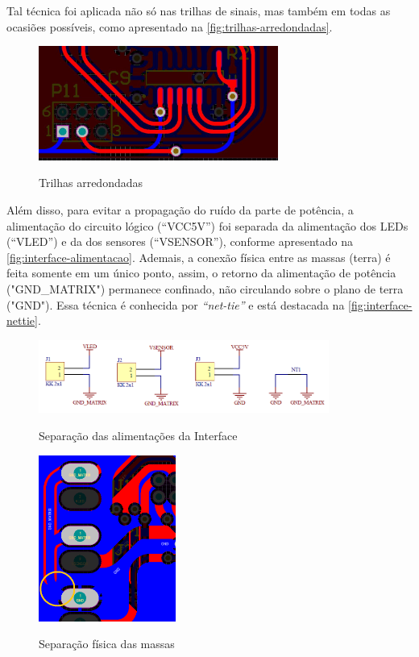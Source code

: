 Tal técnica foi aplicada não só nas trilhas de sinais, mas também em todas as ocasiões possíveis, como apresentado na \autoref{fig:trilhas-arredondadas}.

\begin{figure}[H]
    \centering
    \caption{Trilhas arredondadas}
    \includegraphics[width=0.7\textwidth]{./dados/figuras/trilhas-arredondadas}
    \label{fig:trilhas-arredondadas}
\end{figure}

Além disso, para evitar a propagação do ruído da parte de potência, a alimentação do circuito lógico (``VCC5V'') foi separada da alimentação dos LEDs (``VLED'') e da dos sensores (``VSENSOR''), conforme apresentado na \autoref{fig:interface-alimentacao}. Ademais, a conexão física entre as massas (terra) é feita somente em um único ponto, assim, o retorno da alimentação de potência ("GND\_MATRIX") permanece confinado, não circulando sobre o plano de terra ("GND"). Essa técnica é conhecida por \emph{``net-tie''} e está destacada na \autoref{fig:interface-nettie}.

\begin{figure}[H]
    \centering
    \caption{Separação das alimentações da Interface}
    \includegraphics[width=0.85\textwidth]{./dados/figuras/alimentacao-interface}
    \label{fig:interface-alimentacao}
\end{figure}

\begin{figure}[H]
    \centering
    \caption{Separação física das massas}
    \includegraphics[width=0.4\textwidth]{./dados/figuras/nt-interface}
    \label{fig:interface-nettie}
\end{figure}

